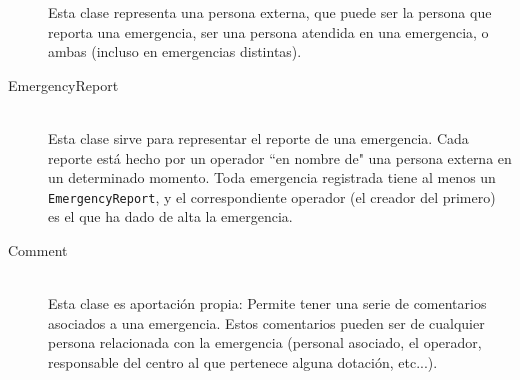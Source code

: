 \begin{description}
        Esta clase representa una persona externa, que puede ser la persona que reporta una emergencia, ser una persona atendida en una emergencia, o ambas (incluso en emergencias distintas).
    \item[EmergencyReport] \hfill \\
        Esta clase sirve para representar el reporte de una emergencia. Cada reporte está hecho por un operador ``en nombre de" una persona externa en un determinado momento. Toda emergencia registrada tiene al menos un \texttt{EmergencyReport}, y el correspondiente operador (el creador del primero) es el que ha dado de alta la emergencia.
    \item[Comment] \hfill \\
        Esta clase es aportación propia: Permite tener una serie de comentarios asociados a una emergencia. Estos comentarios pueden ser de cualquier persona relacionada con la emergencia (personal asociado, el operador, responsable del centro al que pertenece alguna dotación, etc...).
\end{description}
